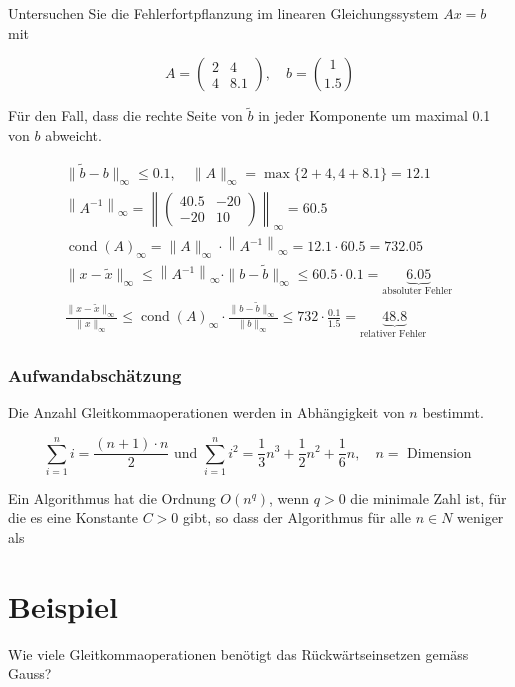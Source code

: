 Untersuchen Sie die Fehlerfortpflanzung im linearen Gleichungssystem $A x=b$ mit

$$
A=\left(\begin{array}{cc}
2 & 4 \\
4 & 8.1
\end{array}\right), \quad b=\binom{1}{1.5}
$$

Für den Fall, dass die rechte Seite von $\tilde{b}$ in jeder Komponente um maximal 0.1 von $b$ abweicht.

$$
\begin{gathered}
\|\tilde{b}-b\|_{\infty} \leq 0.1, \quad\|A\|_{\infty}=\max \{2+4,4+8.1\}=12.1 \\
\left\|A^{-1}\right\|_{\infty}=\left\|\left(\begin{array}{cc}
40.5 & -20 \\
-20 & 10
\end{array}\right)\right\|_{\infty}=60.5 \\
\operatorname{cond}(A)_{\infty}=\|A\|_{\infty} \cdot\left\|A^{-1}\right\|_{\infty}=12.1 \cdot 60.5=732.05 \\
\|x-\tilde{x}\|_{\infty} \leq\left\|A^{-1}\right\|_{\infty} \cdot\|b-\tilde{b}\|_{\infty} \leq 60.5 \cdot 0.1=\underbrace{6.05}_{\text {absoluter Fehler }} \\
\frac{\|x-\tilde{x}\|_{\infty}}{\|x\|_{\infty}} \leq \operatorname{cond}(A)_{\infty} \cdot \frac{\|b-\tilde{b}\|_{\infty}}{\|b\|_{\infty}} \leq 732 \cdot \frac{0.1}{1.5}=\underbrace{48.8}_{\text {relativer Fehler }}
\end{gathered}
$$

\subsubsection{Aufwandabschätzung}

Die Anzahl Gleitkommaoperationen werden in Abhängigkeit von $n$ bestimmt.

$$
\sum_{i=1}^{n} i=\frac{(n+1) \cdot n}{2} \text { und } \sum_{i=1}^{n} i^{2}=\frac{1}{3} n^{3}+\frac{1}{2} n^{2}+\frac{1}{6} n, \quad n=\text { Dimension }
$$

Ein Algorithmus hat die Ordnung $O\left(n^{q}\right)$, wenn $q>0$ die minimale Zahl ist, für die es eine Konstante $C>0$ gibt, so dass der Algorithmus für alle $n \in N$ weniger als

\section*{Beispiel}
Wie viele Gleitkommaoperationen benötigt das Rückwärtseinsetzen gemäss Gauss?

